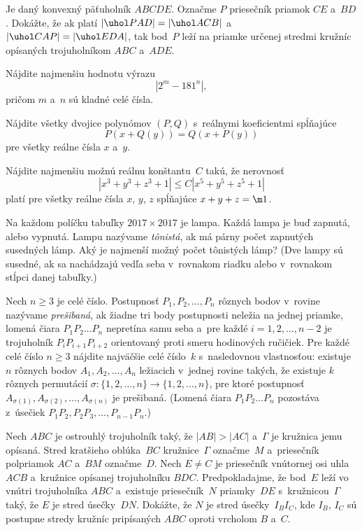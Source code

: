 {%
Je daný konvexný päťuholník $ABCDE$. Označme $P$ priesečník priamok $CE$ a~$BD$. Dokážte, že ak  platí $|\uhol PAD| = |\uhol ACB|$ a~$|\uhol CAP| = |\uhol EDA|$, tak bod~$P$ leží na priamke určenej stredmi kružníc opísaných trojuholníkom $ABC$ a~$ADE$.
}

{%
Nájdite najmenšiu hodnotu výrazu
$$|2^m-181^n|,$$
pričom $m$ a~$n$ sú kladné celé čísla.}

{%
Nájdite všetky dvojice polynómov $(P,Q)$ s~reálnymi koeficientmi spĺňajúce $$P(x+Q(y))=Q(x+P(y))$$ pre všetky reálne čísla $x$ a~$y$.
}

{%
Nájdite najmenšiu možnú reálnu konštantu~$C$ takú, že nerovnosť
$$
|x^3+y^3+z^3+1| \le C |x^5+y^5+z^5+1|
$$
platí pre všetky reálne čísla $x$, $y$, $z$ spĺňajúce $x+y+z=\m1$.
}

{%
Na každom políčku tabuľky $2017 \times 2017$ je lampa. Každá lampa je buď zapnutá, alebo vypnutá. Lampu nazývame {\it tônistá}, ak má párny počet zapnutých susedných lámp. Aký je najmenší možný počet tônistých lámp? (Dve lampy sú susedné, ak sa nachádzajú vedľa seba v~rovnakom riadku alebo v~rovnakom stĺpci danej tabuľky.)
}

{%
Nech $n \ge 3$ je celé číslo. Postupnosť $P_1, P_2, \dots, P_n$ rôznych bodov v~rovine nazývame {\it prešibaná}, ak žiadne tri body postupnosti neležia na jednej priamke, lomená čiara $P_1 P_2 \dots P_n$ nepretína samu seba a~pre každé $i=1,2,\dots,n-2$ je trojuholník $P_iP_{i+1}P_{i+2}$ orientovaný proti smeru hodinových ručičiek. Pre každé celé číslo $n \ge 3$ nájdite najväčšie celé číslo~$k$ s~nasledovnou vlastnosťou: existuje $n$ rôznych bodov $A_1, A_2, \dots, A_n$ ležiacich v~jednej rovine takých, že existuje $k$ rôznych permutácií $\sigma \colon \{1,2,\dots,n\} \to \{1,2,\dots,n\}$, pre ktoré postupnosť $A_{\sigma(1)},A_{\sigma(2)},\dots, A_{\sigma(n)}$ je prešibaná. (Lomená čiara $P_1 P_2 \dots P_n$ pozostáva z~úsečiek $P_1P_2,P_2P_3,\dots,P_{n-1}P_n$.)
}

{%
Nech $ABC$ je ostrouhlý trojuholník taký, že $|AB|>|AC|$ a~$\Gamma$ je kružnica jemu opísaná. Stred kratšieho oblúka~$BC$ kružnice~$\Gamma$ označme~$M$ a~priesečník polpriamok $AC$ a~$BM$ označme~$D$. Nech $E \ne C$ je priesečník vnútornej osi uhla $ACB$ a~kružnice opísanej trojuholníku $BDC$. Predpokladajme, že bod~$E$ leží vo vnútri trojuholníka $ABC$ a~existuje priesečník~$N$ priamky~$DE$ s~kružnicou~$\Gamma$ taký, že $E$ je stred úsečky~$DN$. Dokážte, že $N$ je stred úsečky~$I_BI_C$, kde $I_B$, $I_C$ sú postupne stredy kružníc pripísaných $ABC$ oproti vrcholom $B$ a~$C$.
}

